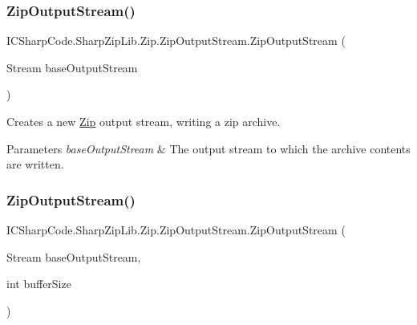 \subsubsection{\texorpdfstring{Zip\+Output\+Stream()}{ZipOutputStream()}\hspace{0.1cm}{\footnotesize\ttfamily [1/2]}}
{\footnotesize\ttfamily I\+C\+Sharp\+Code.\+Sharp\+Zip\+Lib.\+Zip.\+Zip\+Output\+Stream.\+Zip\+Output\+Stream (\begin{DoxyParamCaption}\item[{Stream}]{base\+Output\+Stream }\end{DoxyParamCaption})\hspace{0.3cm}{\ttfamily [inline]}}



Creates a new \hyperlink{namespace_i_c_sharp_code_1_1_sharp_zip_lib_1_1_zip}{Zip} output stream, writing a zip archive. 


\begin{DoxyParams}{Parameters}
{\em base\+Output\+Stream} & The output stream to which the archive contents are written. \\
\hline
\end{DoxyParams}
\mbox{\label{class_i_c_sharp_code_1_1_sharp_zip_lib_1_1_zip_1_1_zip_output_stream_a063fe079e43f665253478472c7ab39a3}} 
\subsubsection{\texorpdfstring{Zip\+Output\+Stream()}{ZipOutputStream()}\hspace{0.1cm}{\footnotesize\ttfamily [2/2]}}
{\footnotesize\ttfamily I\+C\+Sharp\+Code.\+Sharp\+Zip\+Lib.\+Zip.\+Zip\+Output\+Stream.\+Zip\+Output\+Stream (\begin{DoxyParamCaption}\item[{Stream}]{base\+Output\+Stream,  }\item[{int}]{buffer\+Size }\end{DoxyParamCaption})\hspace{0.3cm}{\ttfamily [inline]}}



